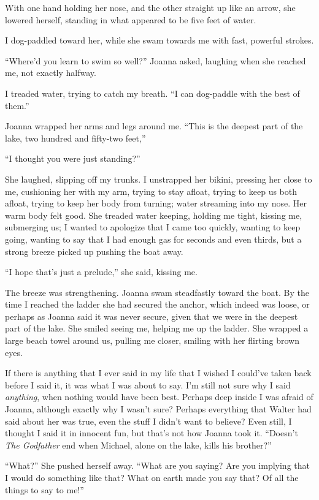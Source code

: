 With one hand holding her nose, and the other straight up like an arrow,
she lowered herself, standing in what appeared to be five feet of water.

I dog-paddled toward her, while she swam towards me with fast, powerful
strokes.

``Where'd you learn to swim so well?'' Joanna asked, laughing when she
reached me, not exactly halfway.

I treaded water, trying to catch my breath. ``I can dog-paddle with the
best of them.''

Joanna wrapped her arms and legs around me. ``This is the deepest part
of the lake, two hundred and fifty-two feet,''

``I thought you were just standing?''

She laughed, slipping off my trunks. I unstrapped her bikini, pressing
her close to me, cushioning her with my arm, trying to stay afloat,
trying to keep us both afloat, trying to keep her body from turning;
water streaming into my nose. Her warm body felt good. She treaded water
keeping, holding me tight, kissing me, submerging us; I wanted to
apologize that I came too quickly, wanting to keep going, wanting to say
that I had enough gas for seconds and even thirds, but a strong breeze
picked up pushing the boat away.

``I hope that's just a prelude,'' she said, kissing me.

The breeze was strengthening. Joanna swam steadfastly toward the boat.
By the time I reached the ladder she had secured the anchor, which
indeed was loose, or perhaps as Joanna said it was never secure, given
that we were in the deepest part of the lake. She smiled seeing me,
helping me up the ladder. She wrapped a large beach towel around us,
pulling me closer, smiling with her flirting brown eyes.

If there is anything that I ever said in my life that I wished I
could've taken back before I said it, it was what I was about to say.
I'm still not sure why I said \emph{anything}, when nothing would have
been best. Perhaps deep inside I was afraid of Joanna, although exactly
why I wasn't sure? Perhaps everything that Walter had said about her was
true, even the stuff I didn't want to believe? Even still, I thought I
said it in innocent fun, but that's not how Joanna took it. ``Doesn't
\emph{The Godfather} end when Michael, alone on the lake, kills his
brother?''

``What?'' She pushed herself away. ``What are you saying? Are you
implying that I would do something like that? What on earth made you say
that? Of all the things to say to me!''

